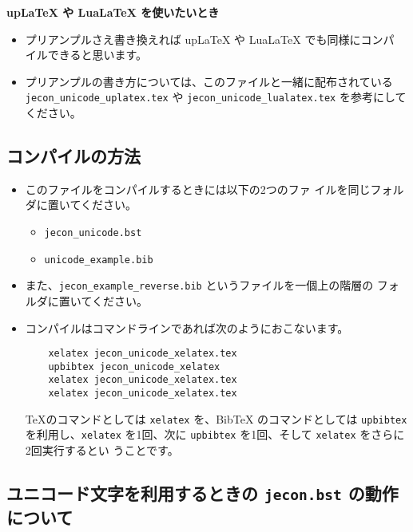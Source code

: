 \documentclass[a4paper,10pt]{bxjsarticle}
\begin{document}
\vspace*{1em}

\textbf{upLaTeX や LuaLaTeX を使いたいとき}
\begin{itemize}
        \item プリアンプルさえ書き換えれば upLaTeX や LuaLaTeX でも同様にコンパ
              イルできると思います。
        \item プリアンプルの書き方については、このファイルと一緒に配布されている
              \texttt{jecon\_unicode\_uplatex.tex} や
              \texttt{jecon\_unicode\_lualatex.tex} を参考にしてください。
\end{itemize}

\subsection{コンパイルの方法}

\begin{itemize}
 \item このファイルをコンパイルするときには以下の2つのファ
       イルを同じフォルダに置いてください。
       \begin{itemize}
        \item \texttt{jecon\_unicode.bst}
        \item \texttt{unicode\_example.bib}
       \end{itemize}
 \item また、\texttt{jecon\_example\_reverse.bib} というファイルを一個上の階層の
       フォルダに置いてください。
 \item コンパイルはコマンドラインであれば次のようにおこないます。
\begin{verbatim}
    xelatex jecon_unicode_xelatex.tex
    upbibtex jecon_unicode_xelatex
    xelatex jecon_unicode_xelatex.tex               
    xelatex jecon_unicode_xelatex.tex
\end{verbatim}
       \TeX のコマンドとしては \texttt{xelatex} を、BibTeX のコマンドとしては
       \texttt{upbibtex} を利用し、\texttt{xelatex} を1回、次に
       \texttt{upbibtex} を1回、そして \texttt{xelatex} をさらに2回実行するとい
       うことです。
\end{itemize}

\subsection{ユニコード文字を利用するときの \texttt{jecon.bst} の動作について}
\end{document}

